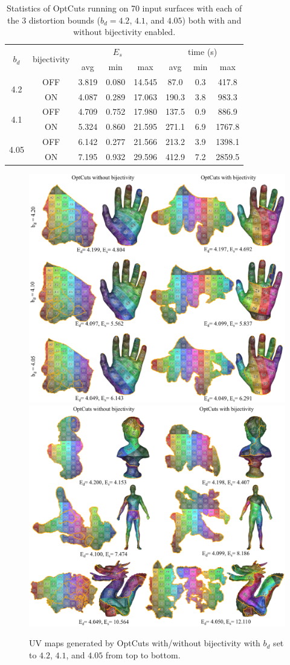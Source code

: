 \begin{table}[!h]
\centering
\caption{Statistics of OptCuts running on 70 input surfaces with each of the 3 distortion bounds ($b_d = 4.2$, $4.1$, and $4.05$) both with and without bijectivity enabled.}
\label{tb:stats_OptCuts}
\begin{tabular}{|c|c|ccc|ccc|}
\hline
\multirow{2}{*}{$b_d$} & \multirow{2}{*}{bijectivity} & \multicolumn{3}{c|}{$E_{s}$} & \multicolumn{3}{c|}{time (s)} \\ \cline{3-8} 
                       &                         & avg      & min     & max      & avg       & min    & max      \\ \hline
\multirow{2}{*}{4.2}   & OFF                    & 3.819   & 0.080  & 14.545  & 87.0   & 0.3 & 417.8 \\
                       & ON                & 4.087   & 0.289  & 17.063  & 190.3   & 3.8 & 983.3  \\ \hline
\multirow{2}{*}{4.1}   & OFF                    & 4.709   & 0.752  & 17.980  & 137.5  & 0.9 & 886.9 \\
                       & ON                & 5.324   & 0.860  & 21.595  & 271.1   & 6.9 & 1767.8  \\ \hline
\multirow{2}{*}{4.05}  & OFF                    & 6.142   & 0.277  & 21.566  & 213.2  & 3.9 & 1398.1   \\
                       & ON                & 7.195   & 0.932  & 29.596  & 412.9   & 7.2 & 2859.5 \\ \hline
\end{tabular}
\end{table}

\begin{figure}[!h]
\centering
\includegraphics[width=0.48\linewidth]{fig/our_impressive_results_left.png}
\includegraphics[width=0.5\linewidth]{fig/our_impressive_results_right.png}
\caption{UV maps generated by OptCuts with/without bijectivity with $b_d$ set to $4.2$, $4.1$, and $4.05$ from top to bottom.}
\label{fig:our_impressive_results}
\end{figure}

